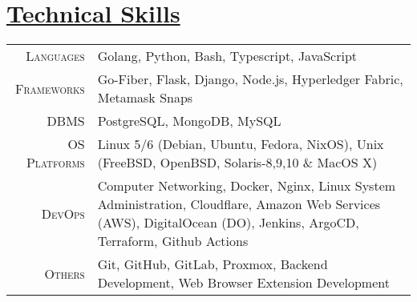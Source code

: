 \documentclass[a4paper,10pt]{extarticle} %
\begin{document}
 \vspace{+0.4cm} \section{\textcolor{primary}{\href{https://www.github.com/proffapt/bodhitree}{Technical Skills}}}

 \vspace{+0.2cm}

 \begin{tabular}{r|p{15cm}}
 \textsc{Languages} & Golang, Python, Bash, Typescript, JavaScript \\
 \textsc{Frameworks} & Go-Fiber, Flask, Django, Node.js, Hyperledger Fabric, Metamask Snaps  \\
 \textsc{DBMS} & PostgreSQL, MongoDB, MySQL \\
 \textsc{OS Platforms} & Linux 5/6 (Debian, Ubuntu, Fedora, NixOS), Unix (FreeBSD, OpenBSD, Solaris-8,9,10 \& MacOS X) \\
 \textsc{DevOps} & Computer Networking, Docker, Nginx, Linux System Administration, Cloudflare, Amazon Web Services (AWS), DigitalOcean (DO), Jenkins, ArgoCD, Terraform, Github Actions \\
 \textsc{Others} & Git, GitHub, GitLab, Proxmox, Backend Development, Web Browser Extension Development \\
 
\end{tabular}
\end{document}
